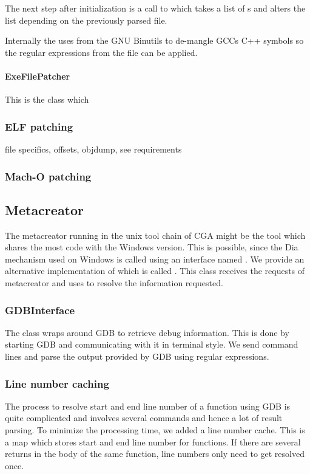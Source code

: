 The next step after initialization is a call to  which takes a list of s and alters the list depending on the previously parsed file.

Internally the  uses  from the GNU Binutils to de-mangle GCCs C++ symbols so the regular expressions from the file can be applied.

\paragraph{ExeFilePatcher} This is the class which 





\subsubsection{ELF patching} 

file specifics, offsets, objdump, see requirements


\subsubsection{Mach-O patching}




\subsection{Metacreator} The metacreator running in the unix tool chain of CGA might be the tool which shares the most code with the Windows version. This is possible, since the Dia mechanism used on Windows is called using an interface named . We provide an alternative implementation of  which is called . This class receives the requests of metacreator and uses  to resolve the information requested.

\subsubsection{GDBInterface} The  class wraps around GDB to retrieve debug information. This is done by starting GDB and communicating with it in terminal style. We send command lines and parse the output provided by GDB using regular expressions. 

\subsubsection{Line number caching} The process to resolve start and end line number of a function using GDB is quite complicated and involves several commands and hence a lot of result parsing. To minimize the processing time, we added a line number cache. This is a map which stores start and end line number for functions. If there are several returns in the body of the same function, line numbers only need to get resolved once.
